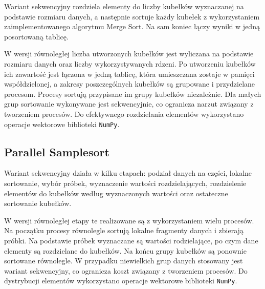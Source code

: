 Wariant sekwencyjny rozdziela elementy do liczby kubełków wyznaczanej na podstawie rozmiaru danych, a następnie 
sortuje każdy kubełek z wykorzystaniem zaimplementowanego algorytmu Merge Sort. Na sam koniec łączy wyniki w jedną posortowaną tablicę.



W wersji równoległej liczba utworzonych kubełków jest wyliczana na podstawie rozmiaru danych oraz liczby wykorzystywanych rdzeni. 
Po utworzeniu kubełków ich zawartość jest łączona w jedną tablicę, która umieszczana zostaje w pamięci współdzielonej, 
a zakresy poszczególnych kubełków są grupowane i przydzielane procesom. Procesy sortują przypisane im grupy kubełków niezależnie. 
Dla małych grup sortowanie wykonywane jest sekwencyjnie, co ogranicza narzut związany z tworzeniem procesów.
Do efektywnego rozdzielania elementów wykorzystano operacje wektorowe biblioteki \texttt{NumPy}.



\subsection{Parallel Samplesort}

Wariant sekwencyjny działa w kilku etapach: podział danych na części, lokalne sortowanie, wybór próbek, wyznaczenie wartości rozdzielających, 
rozdzielenie elementów do kubełków według wyznaczonych wartości oraz ostateczne sortowanie kubełków.



W wersji równoległej etapy te realizowane są z wykorzystaniem wielu procesów. 
Na początku procesy równolegle sortują lokalne fragmenty danych i zbierają próbki. 
Na podstawie próbek wyznaczane są wartości rodzielające, po czym dane elementy są rozdzielane do kubełków. 
Na końcu grupy kubełków są ponownie sortowane równolegle. 
W przypadku niewielkich grup danych stosowany jest wariant sekwencyjny, co ogranicza koszt związany z tworzeniem procesów.
Do dystrybucji elementów wykorzystano operacje wektorowe biblioteki \texttt{NumPy}.

